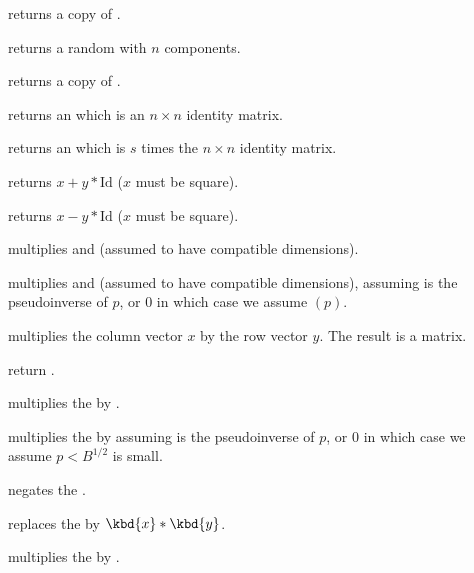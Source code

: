  returns a copy of .


 returns a random  with $n$
components.

 returns a copy of .

 returns an  which is an $n \times n$
identity matrix.

 returns an  which is $s$ times
the $n \times n$ identity matrix.


 returns $x + y*\text{Id}$
($x$ must be square).

 returns $x - y*\text{Id}$
($x$ must be square).

 multiplies   and 
(assumed to have compatible dimensions).

 multiplies  
and  (assumed to have compatible dimensions), assuming  is the
pseudoinverse of $p$, or $0$ in which case we assume
$(p)$.

 multiplies the column vector $x$
by the row vector $y$. The result is a matrix.

return .

 multiplies the 
 by .

 multiplies the
  by  assuming  is the pseudoinverse of $p$,
or $0$ in which case we assume $p < B^{1/2}$ is small.

 negates the  .

 replaces
the   by $\kbd{x}*\kbd{y}$.

 multiplies the 
 by .


